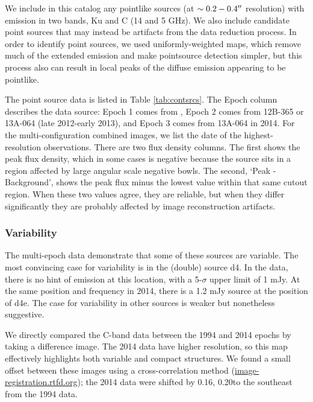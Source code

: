 

We include in this catalog any pointlike sources (at $\sim0.2-0.4\mbox{$^{\prime\prime}$}$
resolution) with emission in two bands, Ku and C (14 and 5 GHz).  We also
include candidate point sources that may instead be artifacts from the data
reduction process.  In order to identify point sources, we used
uniformly-weighted maps, which remove much of the extended emission and make
pointsource detection simpler, but this process also can result in local peaks
of the diffuse emission appearing to be pointlike.

The point source data is listed in Table \ref{tab:contsrcs}.  The Epoch column
describes the data source: Epoch 1 comes from \citet{Mehringer1994a}, Epoch 2
comes from 12B-365 or 13A-064 (late 2012-early 2013), and Epoch 3 comes from
13A-064 in 2014. For the multi-configuration combined images, we list the date
of the highest-resolution observations.  There are two flux density
columns.  The first shows the peak flux density, which in some
cases is negative because the source sits in a region affected by large angular
scale negative bowls.  The second, `Peak - Background', shows the peak flux
minus the lowest value within that same cutout region.  When these two values
agree, they are reliable, but when they differ significantly they are probably
affected by image reconstruction artifacts.



\subsubsection{Variability}
The multi-epoch data demonstrate that some of these sources are variable.  The
most convincing case for variability is in the (double) source d4.  In the
\citet{Mehringer1994a} data, there is no hint of emission at this location,
with a 5-$\sigma$ upper limit of 1 mJy.  At the same position and frequency in
2014, there is a 1.2 mJy source at the position of d4e.  The case for
variability in other sources is weaker but nonetheless suggestive.

We directly compared the C-band data between the 1994 and 2014 epochs by taking
a difference image.  The 2014 data have higher resolution, so this map
effectively highlights both variable and compact structures.  We found a small
offset between these images using a cross-correlation method
(\url{image-registration.rtfd.org}); the 2014 data were shifted by 0.16\arcsec,
0.20\arcsec to the southeast from the 1994 data.



